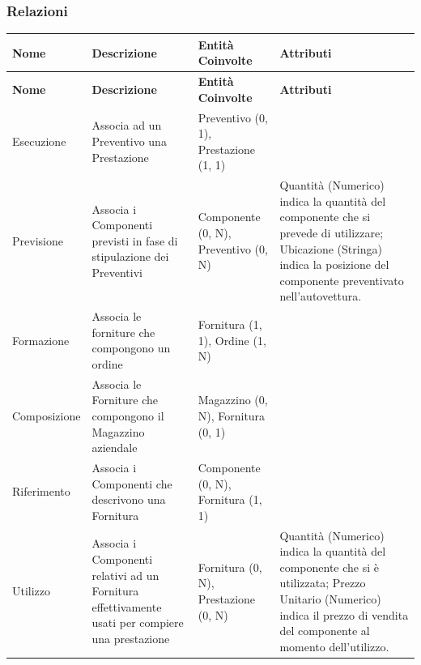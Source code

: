 		\subsubsection{Relazioni}
		\label{sec:relationships}
			{\small
			\begin{longtable}{| p{2cm} | p{4cm} | p{3cm} | p{3cm} |}
				
				\hline
				\textbf{Nome} & 
				\textbf{Descrizione} & 
				\textbf{Entità Coinvolte} & 
				\textbf{Attributi} \\ 
				\hline
				
				\endfirsthead
				
				\hline
				\textbf{Nome} & 
				\textbf{Descrizione} & 
				\textbf{Entità Coinvolte} & 
				\textbf{Attributi} \\ 
				\hline
				
				\endhead
				
				Esecuzione &
				Associa ad un Preventivo una Prestazione &
				Preventivo (0, 1), Prestazione (1, 1) &

				\\ \hline

				Previsione &
				Associa i Componenti previsti in fase di stipulazione dei Preventivi &
				Componente (0, N), Preventivo (0, N) &
				Quantità (Numerico) indica la quantità del componente che si prevede di utilizzare; Ubicazione (Stringa) indica la posizione del componente preventivato nell'autovettura.
				\\ \hline

				Formazione &
				Associa le forniture che compongono un ordine &
				Fornitura (1, 1), Ordine (1, N) &

				\\ \hline

				Composizione &
				Associa le Forniture che compongono il Magazzino aziendale &
				Magazzino (0, N), Fornitura (0, 1) &

				\\ \hline

				Riferimento &
				Associa i Componenti che descrivono una Fornitura &
				Componente (0, N), Fornitura (1, 1) &

				\\ \hline

				Utilizzo &
				Associa i Componenti relativi ad un Fornitura effettivamente usati per compiere una prestazione &
				Fornitura (0, N), Prestazione (0, N) &
				Quantità (Numerico) indica la quantità del componente che si è utilizzata; Prezzo Unitario (Numerico) indica il prezzo di vendita del componente al momento dell'utilizzo.
				\\ \hline


\end{longtable}}
